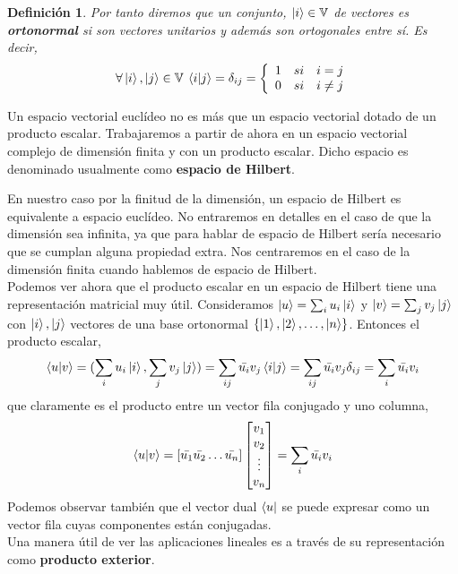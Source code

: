 \documentclass[a4paper]{article}
\newtheorem{deff}{Definición}[section]
\numberwithin{equation}{section}
\begin{document}
\begin{deff}Por tanto diremos que un conjunto, $\ket{i} \in \mathbb{V}$ de vectores es \textbf{ortonormal} si son vectores unitarios y además son ortogonales entre sí. Es decir,
\begin{equation}
\forall \ket{i},\ket{j} \in \mathbb{V} \:
\braket{i|j} = \delta_{ij} = \left\{ 
\begin{array}{lcc}
1 & si & i = j \\
0 & si & i \neq j
\end{array} \right.
\end{equation}
\end{deff}

Un espacio vectorial euclídeo no es más que un espacio vectorial dotado de un producto escalar. Trabajaremos a partir de ahora en un espacio vectorial complejo de dimensión finita y con un producto escalar. Dicho espacio es denominado usualmente como \textbf{espacio de Hilbert}.


En nuestro caso por la finitud de la dimensión, un espacio de Hilbert es equivalente a espacio euclídeo.
No entraremos en detalles en el caso de que la dimensión sea infinita, ya que para hablar de espacio de Hilbert sería necesario que se cumplan alguna propiedad extra. Nos centraremos en el caso de la dimensión finita cuando hablemos de espacio de Hilbert.\\
\linebreak
Podemos ver ahora que el producto escalar en un espacio de Hilbert tiene una representación matricial muy útil.
Consideramos $\ket{u} = \sum_i u_i\ket{i}$ y $\ket{v} = \sum_j v_j\ket{j}$ con $\ket{i}, \ket{j}$ vectores de una base ortonormal $\{ \ket{1}, \ket{2}, \ldots, \ket{n} \}$.
Entonces el producto escalar,
\begin{equation}
\braket{u|v} = (\sum_i u_i\ket{i}, \sum_j v_j\ket{j}) = \sum_{ij} \bar{u_i} v_j\braket{i|j} = \sum_{ij} \bar{u_i} v_j\delta_{ij} = \sum_i \bar{u_i} v_i
\end{equation}
que claramente es el producto entre un vector fila conjugado y uno columna,
\begin{equation}
\braket{u|v} =
\left[ \bar{u_1}  \bar{u_2}  \ldots  \bar{u_n} \right]
\begin{bmatrix}
v_1 \\ v_2 \\ \vdots \\ v_n
\end{bmatrix} =
\sum_i \bar{u_i} v_i
\end{equation}
Podemos observar también que el vector dual $\bra{u}$ se puede expresar como un vector fila cuyas componentes están conjugadas.
\\
Una manera útil de ver las aplicaciones lineales es a través de su representación como \textbf{producto exterior}.
\end{document}

